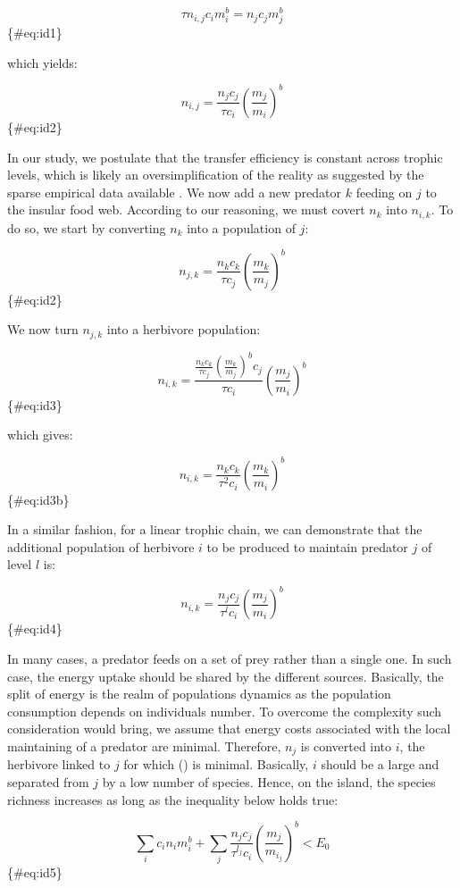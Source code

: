 \[ \tau n_{i,j} c_im_i^b = n_jc_jm_j^b \] \{\#eq:id1\}

which yields:

\[ n_{i,j} = \frac{n_jc_j}{\tau c_i} \left( \frac{m_j}{m_i} \right)^b \]
\{\#eq:id2\}

In our study, we postulate that the transfer efficiency is constant
across trophic levels, which is likely an oversimplification of the
reality as suggested by the sparse empirical data available
\citep{Trebilco2013, Brown2003}. We now add a new predator \(k\) feeding
on \(j\) to the insular food web. According to our reasoning, we must
covert \(n_k\) into \(n_{i,k}\). To do so, we start by converting
\(n_k\) into a population of \(j\):

\[ n_{j,k} = \frac{n_kc_k}{\tau c_j} \left( \frac{m_k}{m_j} \right)^b \]
\{\#eq:id2\}

We now turn \(n_{j,k}\) into a herbivore population:

\[ n_{i,k} = \frac{\frac{n_kc_k}{\tau c_j} \left( \frac{m_k}{m_j} \right)^bc_j}{\tau c_i} \left( \frac{m_j}{m_i} \right)^b \]
\{\#eq:id3\}

which gives:

\[ n_{i,k} = \frac{n_kc_k}{\tau^2 c_i} \left( \frac{m_k}{m_i} \right)^b \]
\{\#eq:id3b\}

In a similar fashion, for a linear trophic chain, we can demonstrate
that the additional population of herbivore \(i\) to be produced to
maintain predator \(j\) of level \(l\) is:

\[ n_{i,k} = \frac{n_jc_j}{\tau^l c_i} \left( \frac{m_j}{m_i} \right)^b \]
\{\#eq:id4\}

In many cases, a predator feeds on a set of prey rather than a single
one. In such case, the energy uptake should be shared by the different
sources. Basically, the split of energy is the realm of populations
dynamics as the population consumption depends on individuals number. To
overcome the complexity such consideration would bring, we assume that
energy costs associated with the local maintaining of a predator are
minimal. Therefore, \(n_j\) is converted into \(i\), the herbivore
linked to \(j\) for which (\citet{eq:id4}) is minimal. Basically, \(i\)
should be a large and separated from \(j\) by a low number of species.
Hence, on the island, the species richness increases as long as the
inequality below holds true:

\[ \sum_i c_in_im_i^b + \sum_j \frac{n_jc_j}{\tau^{l_j} c_i} \left( \frac{m_j}{m_{i_j}} \right)^b < E_0 \]
\{\#eq:id5\}

